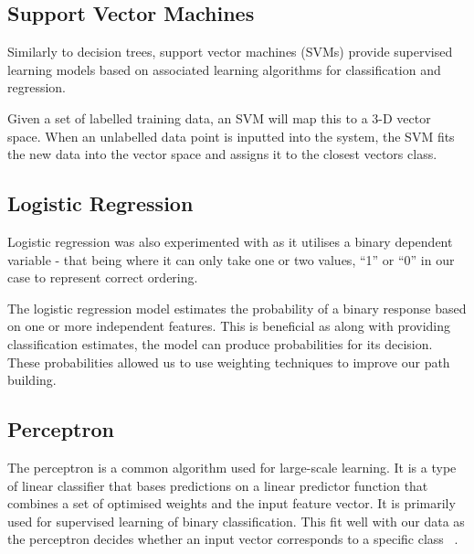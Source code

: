 \documentclass[bsc,frontabs,twoside,singlespacing,parskip,deptreport]{infthesis}     %
\begin{document}

\subsection{Support Vector Machines}
Similarly to decision trees, support vector machines (SVMs) provide supervised learning models based on
associated learning algorithms for classification and regression.

Given a set of labelled training data, an SVM will map this to a 3-D vector space.
When an unlabelled data point is inputted into the system, the SVM fits the new data into the vector space and
assigns  it to the closest vectors class.

\subsection{Logistic Regression}
Logistic regression was also experimented with as it utilises a binary dependent variable - that being where it
can only take one or two values, ``1'' or ``0'' in our case to represent correct ordering.


The logistic regression model estimates the probability of a binary response based on one or more independent features.
This is beneficial as along with providing classification estimates, the model can produce probabilities for its
decision. These probabilities allowed us to use weighting techniques to improve our path building.

\subsection{Perceptron}
The perceptron is a common algorithm used for large-scale learning.
It is a type of linear classifier that bases predictions on a linear predictor function that combines a set of optimised weights
and the input feature vector.
It is primarily used for supervised learning of binary classification.
This fit well with our data as the perceptron decides whether an input vector
corresponds to a specific class ~\cite{freund1999large}.
\end{document}
